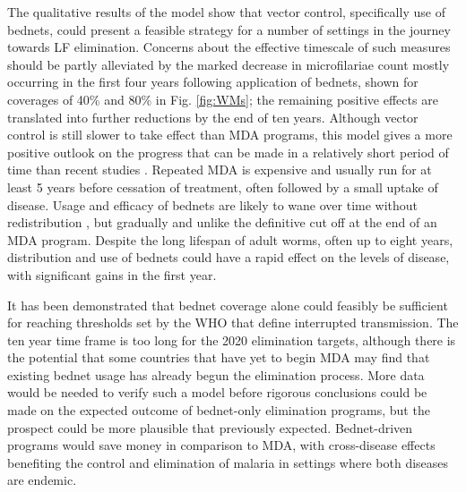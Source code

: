 \documentclass[5p,times]{elsarticle}
\begin{document}
The qualitative results of the model show that vector control, specifically use of bednets, could present a feasible strategy for a number of settings in the journey towards LF elimination. Concerns about the effective timescale of such measures should be partly alleviated by the marked decrease in microfilariae count mostly occurring in the first four years following application of bednets, shown for coverages of 40\% and 80\% in Fig. \ref{fig:WMs}; the remaining positive effects are translated into further reductions by the end of ten years. Although vector control is still slower to take effect than MDA programs, this model gives a more positive outlook on the progress that can be made in a relatively short period of time than recent studies \cite{norman2000}. Repeated MDA is expensive and usually run for at least 5 years before cessation of treatment, often followed by a small uptake of disease. Usage and efficacy of bednets are likely to wane over time without redistribution \cite{kweka2011}, but gradually and unlike the definitive cut off at the end of an MDA program. Despite the long lifespan of adult worms, often up to eight years, distribution and use of bednets could have a rapid effect on the levels of disease, with significant gains in the first year. 

It has been demonstrated that bednet coverage alone could feasibly be sufficient for reaching thresholds set by the WHO that define interrupted transmission. The ten year time frame is too long for the 2020 elimination targets, although there is the potential that some countries that have yet to begin MDA may find that existing bednet usage has already begun the elimination process. More data would be needed to verify such a model before rigorous conclusions could be made on the expected outcome of bednet-only elimination programs, but the prospect could be more plausible that previously expected. Bednet-driven programs would save money in comparison to MDA, with cross-disease effects benefiting the control and elimination of malaria in settings where both diseases are endemic.


%
\appendix
\end{document}
